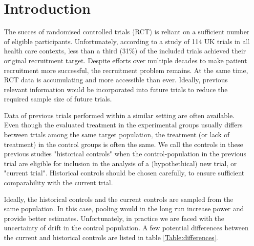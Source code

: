 \documentclass[Royal,sagev,times]{sagej}
\begin{document}
\maketitle
\section{Introduction}
The succes of randomised controlled trials (RCT) is reliant on a sufficient number of eligible participants.\cite{huang2018Recruitment} Unfortunately, according to a study of 114 UK trials in all health care contexts, less than a third (31\%) of the included trials achieved their original recruitment target.\cite{mcdonald2006} Despite efforts over multiple decades to make patient recruitment more successful, the recruitment problem remains.\cite{huang2018Recruitment} At the same time, RCT data is accumulating and more accessible than ever.\cite{dejardin2018} Ideally, previous relevant information would be incorporated into future trials to reduce the required sample size of future trials.

Data of previous trials performed within a similar setting are often available.\cite{vRosmalen2018} Even though the evaluated treatment in the experimental groups usually differs between trials among the same target population, the treatment (or lack of treatment) in the control groups is often the same.\cite{vRosmalen2018} We call the controls in these previous studies "historical controls" when the control-population in the previous trial are eligible for inclusion in the analysis of a (hypothethical) new trial, or "current trial".\cite{vRosmalen2018} Historical controls should be chosen carefully, to ensure sufficient comparability with  the current trial.\cite{vRosmalen2018}

Ideally, the historical controls and the current controls are sampled from the same population. In this case, pooling would in the long run increase power and provide better estimates. Unfortunately, in practice we are faced with the uncertainty of drift in the control population.\cite{viele2014} A few potential differences between the current and historical controls are listed in table \ref{Table:differences}. 
\end{document}
